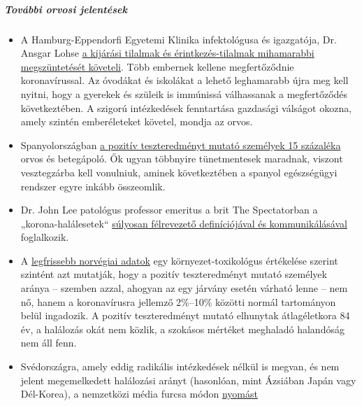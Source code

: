 \hypertarget{tovuxe1bbi-orvosi-jelentuxe9sek}{%
\subparagraph{\texorpdfstring{\textbf{További orvosi
jelentések}}{További orvosi jelentések}}\label{tovuxe1bbi-orvosi-jelentuxe9sek}}

\begin{itemize}
\tightlist
\item
  A Hamburg-Eppendorfi Egyetemi Klinika infektológusa és igazgatója, Dr.
  Ansgar Lohse
  \href{https://www.mopo.de/hamburg/uke-infektiologe-fordert-es-muessen-sich-mehr-menschen-mit-corona-infizieren-36483636?originalReferrer=\&originalReferrer=}{a
  kijárási tilalmak és érintkezés-tilalmak mihamarabbi megszüntetését
  követeli}. Több embernek kellene megfertőződnie koronavírussal. Az
  óvodákat és iskolákat a lehető leghamarabb újra meg kell nyitni, hogy
  a gyerekek és szüleik is immúnissá válhassanak a megfertőződés
  következtében. A szigorú intézkedések fenntartása gazdasági válságot
  okozna, amely szintén emberéleteket követel, mondja az orvos.
\item
  Spanyolországban
  \href{https://www.heise.de/tp/features/Das-ist-keine-Krise-sondern-eine-Katastrophe-4694104.html}{a
  pozitív teszteredményt mutató személyek 15 százaléka} orvos és
  betegápoló. Ők ugyan többnyire tünetmentesek maradnak, viszont
  vesztegzárba kell vonulniuk, aminek következtében a spanyol
  egészségügyi rendszer egyre inkább összeomlik.
\item
  Dr. John Lee patológus professor emeritus a brit The Spectatorban a
  „korona-halálesetek``
  \href{https://www.spectator.co.uk/article/how-to-understand-and-report-figures-for-covid-19-deaths-}{súlyosan
  félrevezető definíciójával és kommunikálásával} foglalkozik.
\item
  A
  \href{https://swprs.files.wordpress.com/2020/04/die-lage-in-norwegen.pdf}{legfrissebb
  norvégiai adatok} egy környezet-toxikológus értékelése szerint
  szintént azt mutatják, hogy a pozitív teszteredményt mutató személyek
  aránya -- szemben azzal, ahogyan az egy járvány esetén várható lenne
  -- nem nő, hanem a koronavírusra jellemző 2\%--10\% közötti normál
  tartományon belül ingadozik. A pozitív teszteredményt mutató elhunytak
  átlagéletkora 84 év, a halálozás okát nem közlik, a szokásos mértéket
  meghaladó halandóság nem áll fenn.
\item
  Svédországra, amely eddig radikális intézkedések nélkül is megvan, és
  nem jelent megemelkedett halálozási arányt (hasonlóan, mint Ázsiában
  Japán vagy Dél-Korea), a nemzetközi média furcsa módon
  \href{https://www.theguardian.com/world/2020/mar/30/catastrophe-sweden-coronavirus-stoicism-lockdown-europe}{nyomást
}
\end{itemize}
